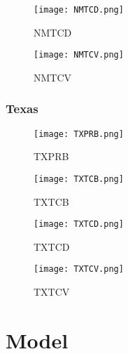 \documentclass{mcmthesis}
\newcommand{\rmnum}[1]{\romannumeral #1}
\begin{document}
\begin{figure}[H]
\begin{minipage}[htb]{0.5\textwidth}
\centering
\texttt{[image: NMTCD.png]}
\caption{NMTCD} \label{fig:NMTCD}
\end{minipage}
\begin{minipage}[htb]{0.5\textwidth}
\centering
\texttt{[image: NMTCV.png]}
\caption{NMTCV} \label{fig:NMTCV}
\end{minipage}
\end{figure}

\subsubsection{Texas}
\begin{figure}[H]
\begin{minipage}[htb]{0.5\textwidth}
\centering
\texttt{[image: TXPRB.png]}
\caption{TXPRB} \label{fig:TXPRB}
\end{minipage}
\begin{minipage}[htb]{0.5\textwidth}
\centering
\texttt{[image: TXTCB.png]}
\caption{TXTCB} \label{fig:TXTCB}
\end{minipage}
\end{figure}

\begin{figure}[H]
\begin{minipage}[htb]{0.5\textwidth}
\centering
\texttt{[image: TXTCD.png]}
\caption{TXTCD} \label{fig:TXTCD}
\end{minipage}
\begin{minipage}[htb]{0.5\textwidth}
\centering
\texttt{[image: TXTCV.png]}
\caption{TXTCV} \label{fig:TXTCV}
\end{minipage}
\end{figure}


\section{Model}




\newpage
\setcounter{page}{2}
\pagestyle{fancy} 
\rhead{\small\sffamily  \rmnum{\thepage}}



\end{document}
